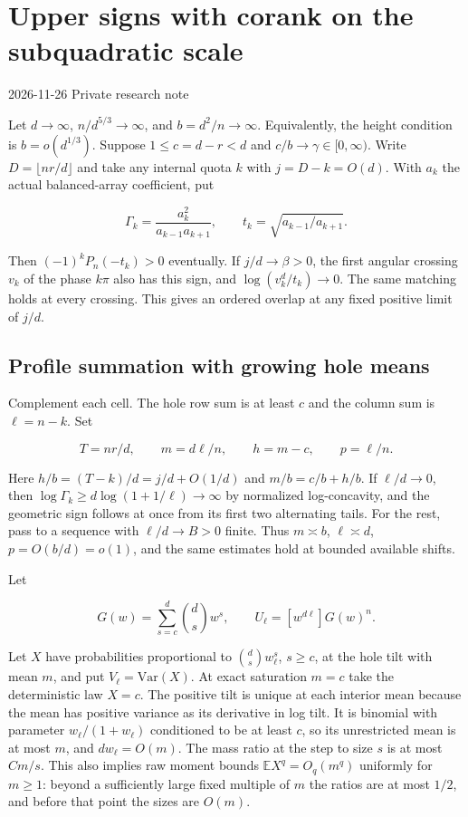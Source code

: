 \section{Upper signs with corank on the subquadratic scale}\label{sec:subquadratic-scaling-corank-upper}

2026-11-26 \enspace Private research note

Let $d\to\infty$, $n/d^{5/3}\to\infty$, and $b=d^2/n\to\infty$. Equivalently, the height condition is $b=o(d^{1/3})$. Suppose $1\le c=d-r<d$ and $c/b\to\gamma\in[0,\infty)$. Write $D=\lfloor nr/d\rfloor$ and take any internal quota $k$ with $j=D-k=O(d)$. With $a_k$ the actual balanced-array coefficient, put

\begin{equation*}
\Gamma_k=\frac{a_k^2}{a_{k-1}a_{k+1}},\qquad
t_k=\sqrt{a_{k-1}/a_{k+1}}.
\end{equation*}

Then $(-1)^k P_n(-t_k)>0$ eventually. If $j/d\to\beta>0$, the first angular crossing $v_k$ of the phase $k\pi$ also has this sign, and $\log(v_k^d/t_k)\to0$. The same matching holds at every crossing. This gives an ordered overlap at any fixed positive limit of $j/d$.

\subsection{Profile summation with growing hole means}

Complement each cell. The hole row sum is at least $c$ and the column sum is $\ell=n-k$. Set

\begin{equation*}
T=nr/d,\qquad m=d\ell/n,\qquad h=m-c,\qquad p=\ell/n.
\end{equation*}

Here $h/b=(T-k)/d=j/d+O(1/d)$ and $m/b=c/b+h/b$. If $\ell/d\to0$, then $\log\Gamma_k\ge d\log(1+1/\ell)\to\infty$ by normalized log-concavity, and the geometric sign follows at once from its first two alternating tails. For the rest, pass to a sequence with $\ell/d\to B>0$ finite. Thus $m\asymp b$, $\ell\asymp d$, $p=O(b/d)=o(1)$, and the same estimates hold at bounded available shifts.

Let

\begin{equation*}
G(w)=\sum_{s=c}^d\binom ds w^s,\qquad
U_\ell=[w^{d\ell}]G(w)^n .
\end{equation*}

Let $X$ have probabilities proportional to $\binom ds w_\ell^s$, $s\ge c$, at the hole tilt with mean $m$, and put $V_\ell=\mathrm{Var}(X)$. At exact saturation $m=c$ take the deterministic law $X=c$. The positive tilt is unique at each interior mean because the mean has positive variance as its derivative in log tilt. It is binomial with parameter $w_\ell/(1+w_\ell)$ conditioned to be at least $c$, so its unrestricted mean is at most $m$, and $dw_\ell=O(m)$. The mass ratio at the step to size $s$ is at most $C m/s$. This also implies raw moment bounds $\mathbb E X^q=O_q(m^q)$ uniformly for $m\ge1$: beyond a sufficiently large fixed multiple of $m$ the ratios are at most $1/2$, and before that point the sizes are $O(m)$.


